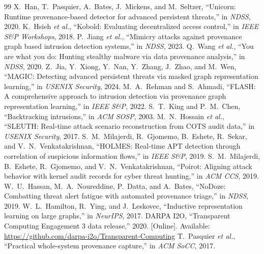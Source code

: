 \documentclass[journal]{IEEEtran}
\begin{document}
\begin{thebibliography}{99}
 X.~Han, T.~Pasquier, A.~Bates, J.~Mickens, and
M.~Seltzer, ``Unicorn: Runtime provenance-based detector for advanced
persistent threats,'' in \emph{NDSS}, 2020.
 K.~Hsieh \emph{et al.}, ``Kobold: Evaluating
decentralized access control,'' in \emph{IEEE S\&P Workshops}, 2018.
 P.~Jiang \emph{et al.}, ``Mimicry attacks against
provenance graph based intrusion detection systems,'' in \emph{NDSS}, 2023.
 Q.~Wang \emph{et al.}, ``You are what you do: Hunting
stealthy malware via data provenance analysis,'' in \emph{NDSS}, 2020.
 Z.~Jia, Y.~Xiong, Y.~Nan, Y.~Zhang, J.~Zhao, and
M.~Wen, ``MAGIC: Detecting advanced persistent threats via masked graph
representation learning,'' in \emph{USENIX Security}, 2024.
 M.~A.~Rehman and S.~Ahmadi, ``FLASH: A comprehensive
approach to intrusion detection via provenance graph representation learning,''
in \emph{IEEE S\&P}, 2022.
 S.~T.~King and P.~M.~Chen, ``Backtracking
intrusions,'' in \emph{ACM SOSP}, 2003.
 M.~N.~Hossain \emph{et al.}, ``SLEUTH: Real-time
attack scenario reconstruction from COTS audit data,'' in \emph{USENIX
Security}, 2017.
 S.~M.~Milajerdi, R.~Gjomemo, B.~Eshete,
R.~Sekar, and V.~N.~Venkatakrishnan, ``HOLMES: Real-time APT detection through
correlation of suspicious information flows,'' in \emph{IEEE S\&P}, 2019.
 S.~M.~Milajerdi, B.~Eshete, R.~Gjomemo, and
V.~N.~Venkatakrishnan, ``Poirot: Aligning attack behavior with kernel audit
records for cyber threat hunting,'' in \emph{ACM CCS}, 2019.
 W.~U.~Hassan, M.~A.~Noureddine, P.~Datta, and
A.~Bates, ``NoDoze: Combatting threat alert fatigue with automated provenance
triage,'' in \emph{NDSS}, 2019.
 W.~L.~Hamilton, R.~Ying, and J.~Leskovec,
``Inductive representation learning on large graphs,'' in \emph{NeurIPS}, 2017.
 DARPA I2O, ``Transparent Computing Engagement 3 data
release,'' 2020. [Online]. Available:
\url{https://github.com/darpa-i2o/Transparent-Computing}
 T.~Pasquier \emph{et al.}, ``Practical
whole-system provenance capture,'' in \emph{ACM SoCC}, 2017.
\end{thebibliography}
\end{document}

